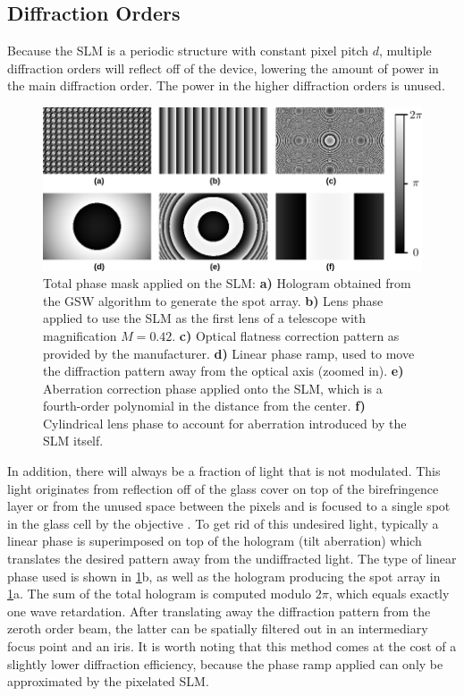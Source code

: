 \subsection{Diffraction Orders}\label{subsec:Diffraction}

Because the SLM is a periodic structure with constant pixel pitch $d$, multiple diffraction orders will reflect off of the device, lowering the amount of power in the main diffraction order.
The power in the higher diffraction orders is unused. 

\begin{figure}
	\centering
	\includegraphics[width=\textwidth]{figures/hologram.png}
	\caption{
		Total phase mask applied on the SLM: \textsf{\textbf{a)}} Hologram obtained from the \ac{GSW} algorithm to generate the spot array.
		\textsf{\textbf{b)}} Lens phase applied to use the SLM as the first lens of a telescope with magnification $M=0.42$.
		\textsf{\textbf{c)}} Optical flatness correction pattern as provided by the manufacturer.
		\textsf{\textbf{d)}} Linear phase ramp, used to move the diffraction pattern away from the optical axis (zoomed in).
		\textsf{\textbf{e)}} Aberration correction phase applied onto the SLM, which is a fourth-order polynomial in the distance from the center.
		\textsf{\textbf{f)}} Cylindrical lens phase to account for aberration introduced by the SLM itself.
	}
	\label{fig:SLMphase}
\end{figure}

In addition, there will always be a fraction of light that is not modulated.
This light originates from reflection off of the glass cover on top of the birefringence layer or from the unused space between the pixels and is focused to a single spot in the glass cell by the objective \cite{Bijnen2013}.
To get rid of this undesired light, typically a linear phase is superimposed on top of the hologram (tilt aberration) which translates the desired pattern away from the undiffracted light.
The type of linear phase used is shown in \cref{fig:SLMphase}b, as well as the hologram producing the spot array in \cref{fig:SLMphase}a.
The sum of the total hologram is computed modulo $2\pi$, which equals exactly one wave retardation.
After translating away the diffraction pattern from the zeroth order beam, the latter can be spatially filtered out in an intermediary focus point and an iris. 
It is worth noting that this method comes at the cost of a slightly lower diffraction efficiency, because the phase ramp applied can only be approximated by the pixelated SLM.


